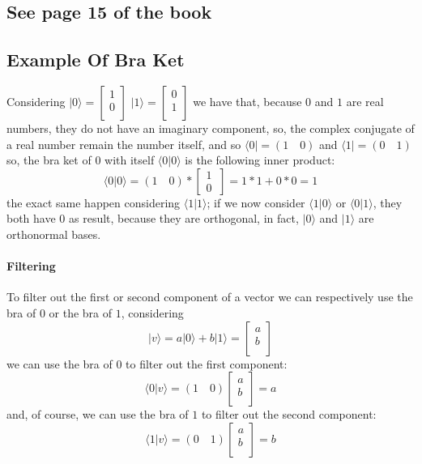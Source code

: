 \documentclass[12pt,a4paper]{report}
\begin{document}
\subsection{See page 15 of the book}

\subsection{Example Of Bra Ket}
Considering
$|0\rangle =
\begin{bmatrix}
1 \\
0 \\
\end{bmatrix}$
$ |1\rangle =
\begin{bmatrix}
0 \\
1 \\
\end{bmatrix}
$
we have that, because $0$ and $1$ are real numbers, they do not have an imaginary component, so, the complex conjugate of a real number remain the number itself, and so
$ \langle0| = (1 \quad 0) $ and $ \langle1| = (0 \quad 1) $
so, the bra ket of $0$ with itself $ \langle  0 | 0 \rangle $ is the following inner product: $$ \langle  0 | 0 \rangle  = (1 \quad 0) * \begin{bmatrix} 1 \\ 0 \ \end{bmatrix} = 1*1 + 0*0 = 1 $$
the exact same happen considering $ \langle 1|1 \rangle $; if we now consider $ \langle 1|0 \rangle $ or $ \langle 0|1 \rangle $, they both have $0$ as result, because they are orthogonal, in fact, $ |0\rangle $ and $|1\rangle$ are orthonormal bases.

\paragraph{Filtering}
To filter out the first or second component of a vector we can respectively use the bra of $0$ or the bra of $1$, considering
$$
| v \rangle = a | 0 \rangle + b | 1 \rangle =
\begin{bmatrix}
a \\
b \\
\end{bmatrix}
$$
we can use the bra of $0$ to filter out the first component:
$$
\langle 0 | v \rangle
=
(1 \quad 0)
\begin{bmatrix}
a \\
b \\
\end{bmatrix}
=
a
$$
and, of course, we can use the bra of $1$ to filter out the second component:
$$
\langle 1 | v \rangle
=
(0 \quad 1)
\begin{bmatrix}
a \\
b \\
\end{bmatrix}
=
b
$$
\end{document}
